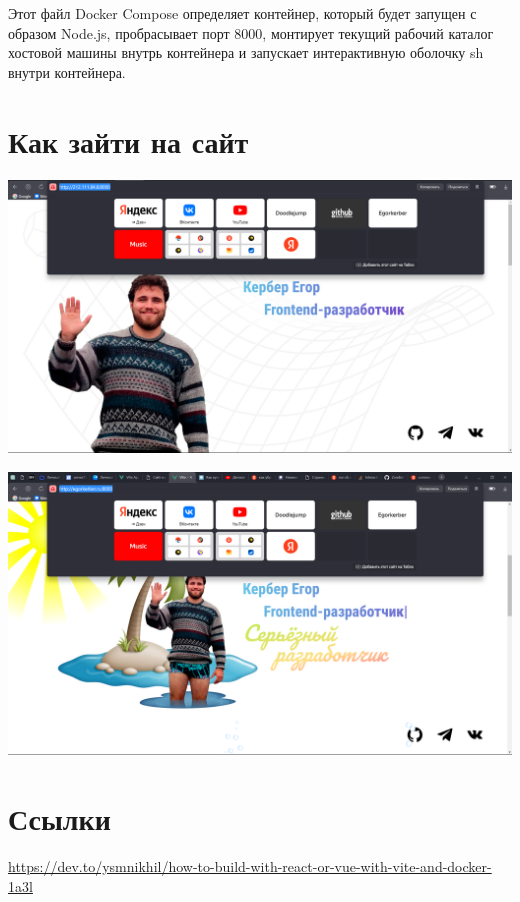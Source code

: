 \documentclass[14pt, a4paper]{extarticle}
\begin{document}
Этот файл Docker Compose определяет контейнер, который будет запущен с образом Node.js, пробрасывает порт 8000, монтирует текущий рабочий каталог хостовой машины внутрь контейнера и запускает интерактивную оболочку sh внутри контейнера.

\newpage
\section{Как зайти на сайт}

\includegraphics*[width=0.8\linewidth]{img/2024-02-17-22-14-45.png}

\includegraphics*[width=0.8\linewidth]{img/2024-02-17-22-14-58.png}

\section*{Ссылки}

\href{https://dev.to/ysmnikhil/how-to-build-with-react-or-vue-with-vite-and-docker-1a3l}{https://dev.to/ysmnikhil/how-to-build-with-react-or-vue-with-vite-and-docker-1a3l}
\end{document}
